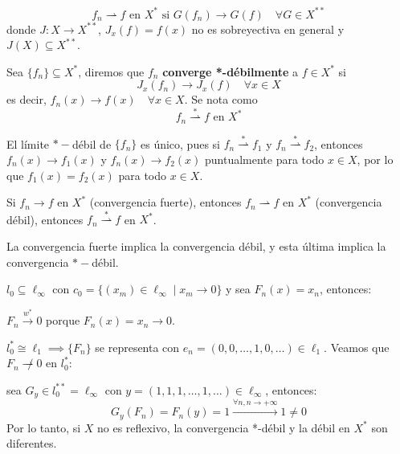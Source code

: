\begin{equation*}
    f_n \rightharpoonup  f \text{ en } X^* \text{ si } G(f_n) \longrightarrow G(f) \quad \forall G \in X^{**}
\end{equation*}
donde $J: X \longrightarrow X^{**}$, $J_x(f) = f(x)$ no es sobreyectiva en general y $J(X) \subseteq X^{**}$.

\begin{definicion}
    Sea $\{f_n\} \subseteq X^*$, diremos que $f_n$ \textbf{converge *-débilmente} a $f \in X^*$ si
    \begin{equation*}
        J_x(f_n) \longrightarrow J_x(f) \quad \forall x \in X
    \end{equation*}
    es decir, $f_n(x) \longrightarrow f(x) \quad \forall x \in X$. Se nota como 
    \begin{equation*}
        f_n \overset{*}{\rightharpoonup} f \text{ en } X^*
    \end{equation*}
\end{definicion}

\begin{observacion}
    El límite $*-$débil de $\{f_n\}$ es único, pues si $f_n \overset{*}{\rightharpoonup} f_1$ y $f_n \overset{*}{\rightharpoonup} f_2$, entonces \mbox{$f_n(x) \longrightarrow f_1(x)$} y \mbox{$f_n(x) \longrightarrow f_2(x)$} puntualmente para todo $x \in X$, por lo que $f_1(x) = f_2(x)$ para todo $x \in X$.
\end{observacion}

\begin{observacion}
    Si $f_n \longrightarrow f$ en $X^*$ (convergencia fuerte), entonces $f_n \rightharpoonup f$ en $X^*$ (convergencia débil), entonces $f_n \overset{*}{\rightharpoonup} f$ en $X^*$.
\end{observacion}
\begin{prop}
    La convergencia fuerte implica la convergencia débil, y esta última implica la convergencia $*-$débil.
\end{prop}

\begin{ejemplo}
    $l_0 \subseteq \ell_\infty$ con $c_0 = \{ (x_m) \in \ell_\infty \mid x_m \to 0 \}$ y sea $F_n(x) = x_n$, entonces:

    $F_n \xrightarrow{w^*} 0$ porque $F_n(x) = x_n \longrightarrow 0$.

    $l_0^* \cong \ell_1 \implies \{F_n\}$ se representa con $e_n = (0, 0, \dots, 1, 0, \dots) \in \ell_1$. Veamos que $F_n \not\rightharpoonup 0$ en $l_0^*$:

    sea $G_y \in l_0^{**} = \ell_\infty$ con $y = (1, 1, 1, \dots, 1, \dots) \in \ell_\infty$, entonces:
    \[ G_y(F_n) = F_n(y) = 1 \xrightarrow{\forall n, n \to +\infty} 1 \neq 0 \]
    Por lo tanto, si $X$ no es reflexivo, la convergencia *-débil y la débil en $X^*$ son diferentes.
\end{ejemplo}

